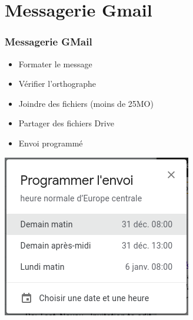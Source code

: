 \documentclass{beamer}
\begin{document}
\section{Messagerie Gmail}

\begin{frame}
\frametitle{Messagerie GMail}

\begin{minipage}{0.48\textwidth}
	\begin{itemize}
		\item Formater le message
		\item Vérifier l'orthographe
		\item Joindre des fichiers (moins de 25MO)
		\item Partager des fichiers Drive
		\item Envoi programmé
	\end{itemize}
	\includegraphics[width=.6\textwidth]{..//img/Bweb02-ri-gmail/gmail-sendlater.png}
\end{minipage}
\begin{minipage}{0.48\textwidth}

\end{minipage}
\end{frame}
\end{document}
